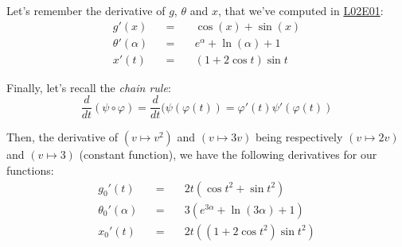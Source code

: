 \documentclass[solutions.tex]{subfiles}
\begin{document}
Let's remember the derivative of $g$, $\theta$ and $x$, that we've
computed in
\href{https://github.com/mbivert/ttm/blob/master/cm/L02E01.pdf}{L02E01}:
\begin{equation*} \begin{aligned}
	g'(x) &&=\quad& \cos(x)+\sin(x) \\
	\theta'(\alpha) &&=\quad& e^\alpha+\ln(\alpha)+1 \\
	x'(t) &&=\quad& (1+2\cos t)\sin t
\end{aligned} \end{equation*}

Finally, let's recall the \textit{chain rule}:
\[
	\frac{d}{dt}(\psi\circ\varphi) = \frac{d}{dt}(\psi(\varphi(t)) = \varphi'(t)\psi'(\varphi(t))
\]

Then, the derivative of $(v \mapsto v^2)$ and $(v \mapsto 3v)$ being respectively
$(v \mapsto 2v)$ and $(v \mapsto 3)$ (constant function), we have the following
derivatives for our functions:
\begin{equation*} \begin{aligned}
	g_0'(t) &&=\quad& \boxed{2t(\cos t^2 + \sin t^2)} \\
	\theta_0'(\alpha) &&=\quad& \boxed{3(e^{3\alpha}+\ln(3\alpha)+1)} \\
	x_0'(t) &&=\quad& \boxed{2t((1+2\cos t^2)\sin t^2)}
\end{aligned} \end{equation*}
\end{document}
